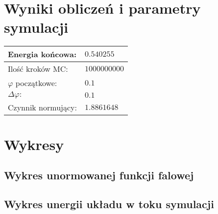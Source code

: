 \documentclass{article}
\begin{document}
\newpage
\section{Wyniki obliczeń i parametry symulacji}
\begin{center}
\begin{tabular}{p{5cm}|p{5cm}}
	Energia końcowa: & $0.540255$\\
	\hline
	Ilość kroków MC: & $1 000 000 000$\\
	\hline
	$\varphi$ początkowe: & $0.1$\\
	\hline
	$\Delta \varphi:$ & $0.1$\\
	\hline
	Czynnik normujący: & $1.8861648$\\
\end{tabular}
\end{center}

\section{Wykresy}
\subsection{Wykres unormowanej funkcji falowej}

\subsection{Wykres unergii układu w toku symulacji}
\end{document}
